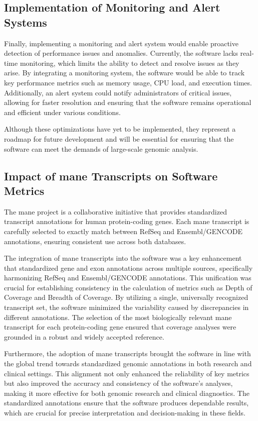 \subsection{Implementation of Monitoring and Alert Systems}
Finally, implementing a monitoring and alert system would enable proactive detection of performance issues and anomalies. Currently, the software lacks real-time monitoring, which limits the ability to detect and resolve issues as they arise. By integrating a monitoring system, the software would be able to track key performance metrics such as memory usage, CPU load, and execution times. Additionally, an alert system could notify administrators of critical issues, allowing for faster resolution and ensuring that the software remains operational and efficient under various conditions.

Although these optimizations have yet to be implemented, they represent a roadmap for future development and will be essential for ensuring that the software can meet the demands of large-scale genomic analysis.

\subsection{Impact of \acl{mane} Transcripts on Software Metrics}

The \ac{mane} project is a collaborative initiative that provides standardized transcript annotations for human protein-coding genes. Each \ac{mane} transcript is carefully selected to exactly match between RefSeq and Ensembl/GENCODE annotations, ensuring consistent use across both databases. \cite{Morales2022}

The integration of \ac{mane} transcripts into the software was a key enhancement that standardized gene and exon annotations across multiple sources, specifically harmonizing RefSeq and Ensembl/GENCODE annotations. This unification was crucial for establishing consistency in the calculation of metrics such as Depth of Coverage and Breadth of Coverage. By utilizing a single, universally recognized transcript set, the software minimized the variability caused by discrepancies in different annotations. The selection of the most biologically relevant \ac{mane} transcript for each protein-coding gene ensured that coverage analyses were grounded in a robust and widely accepted reference. 

Furthermore, the adoption of \ac{mane} transcripts brought the software in line with the global trend towards standardized genomic annotations in both research and clinical settings. This alignment not only enhanced the reliability of key metrics but also improved the accuracy and consistency of the software's analyses, making it more effective for both genomic research and clinical diagnostics. The standardized annotations ensure that the software produces dependable results, which are crucial for precise interpretation and decision-making in these fields.

